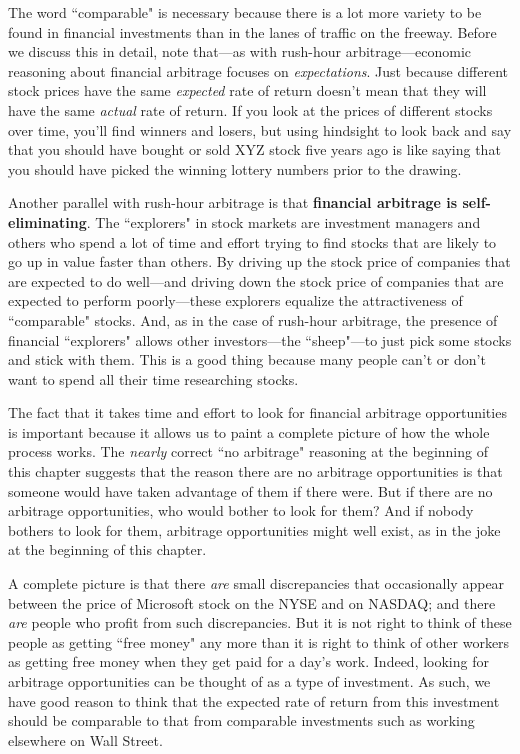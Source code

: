 The word ``comparable" is necessary because there is a lot more variety to be found in financial investments than in the lanes of traffic on the freeway. Before we discuss this in detail, note that---as with rush-hour arbitrage---economic reasoning about financial arbitrage focuses on \emph{expectations}. Just because different stock prices have the same \emph{expected} rate of return doesn't mean that they will have the same \emph{actual} rate of return. If you look at the prices of different stocks over time, you'll find winners and losers, but using hindsight to look back and say that you should have bought or sold XYZ stock five years ago is like saying that you should have picked the winning lottery numbers prior to the drawing.

Another parallel with rush-hour arbitrage is that \textbf{financial arbitrage is self-eliminating}. The ``explorers" in stock markets are investment managers and others who spend a lot of time and effort trying to find stocks that are likely to go up in value faster than others. By driving up the stock price of companies that are expected to do well---and driving down the stock price of companies that are expected to perform poorly---these explorers equalize the attractiveness of ``comparable" stocks. And, as in the case of rush-hour arbitrage, the presence of financial ``explorers" allows other investors---the ``sheep"---to just pick some stocks and stick with them. This is a good thing because many people can't or don't want to spend all their time researching stocks.

The fact that it takes time and effort to look for financial arbitrage opportunities is important because it allows us to paint a complete picture of how the whole process works. The \emph{nearly} correct ``no arbitrage" reasoning at the beginning of this chapter suggests that the reason there are no arbitrage opportunities is that someone would have taken advantage of them if there were. But if there are no arbitrage opportunities, who would bother to look for them? And if nobody bothers to look for them, arbitrage opportunities might well exist, as in the joke at the beginning of this chapter.

A complete picture is that there \emph{are} small discrepancies that occasionally appear between the price of Microsoft stock on the NYSE and on NASDAQ; and there \emph{are} people who profit from such discrepancies. But it is not right to think of these people as getting ``free money" any more than it is right to think of other workers as getting free money when they get paid for a day's work. Indeed, looking for arbitrage opportunities can be thought of as a type of investment. As such, we have good reason to think that the expected rate of return from this investment should be comparable to that from comparable investments such as working elsewhere on Wall Street.%


